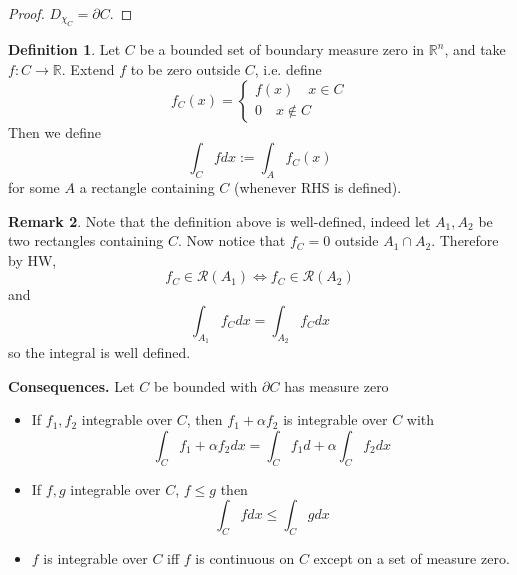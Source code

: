 \documentclass[11pt,a4paper]{article}
\theoremstyle{definition}
\newtheorem{definition}{Definition}[section]
\newtheorem{remark}[definition]{Remark}
\theoremstyle{plain}
\theoremstyle{remark}
\newcommand{\R}{\mathbb{R}}
\begin{document}
\begin{proof}
    $D_{\chi_C} = \partial C$.
\end{proof}

\begin{definition}
    Let $C$ be a bounded set of boundary measure zero in $\R^n$, and take $f \colon C \to \R$. Extend
    $f$ to be zero outside $C$, i.e. define 
    $$f_C (x) = \begin{cases}
        f(x) \quad x \in C \\
        0 \quad x \not\in C
    \end{cases}$$
    Then we define 
    $$\int_C f dx := \int_A f_C (x)$$
    for some $A$ a rectangle containing $C$ (whenever RHS is defined).
\end{definition}

\begin{remark}
    Note that the definition above is well-defined, indeed let $A_1, A_2$ be two rectangles containing $C$. Now notice that 
    $f_C = 0$ outside $A_1 \cap A_2$. Therefore by HW, 
    $$f_C \in \mathcal{R}(A_1) \iff f_C \in \mathcal{R}(A_2)$$
    and 
    $$\int_{A_1} f_C dx = \int_{A_2} f_C dx$$
    so the integral is well defined.
\end{remark}

\textbf{Consequences.} Let $C$ be bounded with $\partial C$ has measure zero
\begin{itemize}
    \item If $f_1, f_2$ integrable over $C$, then $f_1 + \alpha f_2$ is integrable over $C$ with 
    $$\int_C f_1 + \alpha f_2 dx = \int_C f_1 d + \alpha \int_C f_2 dx$$

    \item If $f,g$ integrable over $C$, $f \le g$ then 
    $$\int_C f dx \le \int_C g dx$$
    
    \item $f$ is integrable over $C$ iff $f$ is continuous on $C$ except on a set of measure zero.
\end{itemize}
\end{document}

